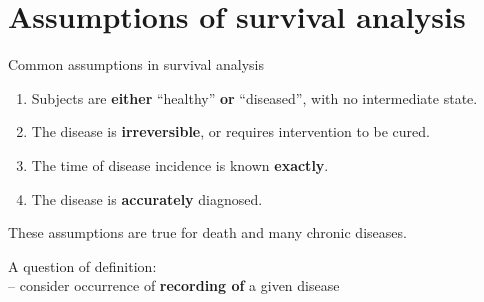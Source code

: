 \section{Assumptions of survival analysis}

\begin{frame}{Common assumptions in survival analysis}
    \begin{enumerate}
      \item Subjects are \textbf{either} ``healthy'' \textbf{or} ``diseased'', with
	no intermediate state.
      \item The disease is \textbf{irreversible}, or requires intervention
	to be cured.
      \item The time of disease incidence is known \textbf{exactly}.
      \item The disease is \textbf{accurately} diagnosed.
    \end{enumerate}
    \pause
    These assumptions are true for \alert{death} and many
    \alert{chronic diseases}.
    \pause
    
    A question of definition:\\ -- consider occurrence of \textbf{recording of} a
    given disease
\end{frame}


